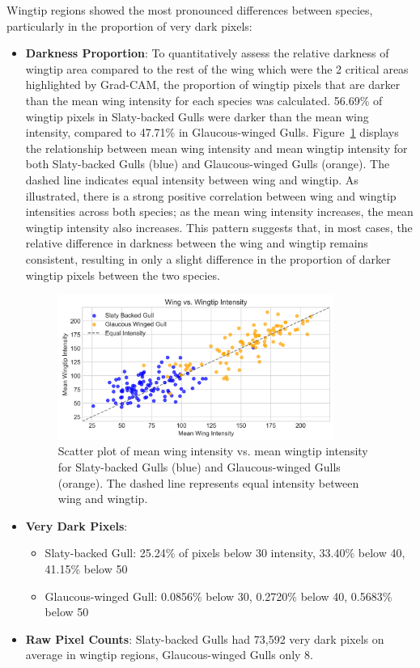 \documentclass[a4paper,12pt]{report}
\begin{document}
Wingtip regions showed the most pronounced differences between species, particularly in the proportion of very dark pixels:

\begin{itemize}
    \item \textbf{Darkness Proportion}: 
    To quantitatively assess the relative darkness of wingtip area compared to the rest of the wing which were the 2 critical areas highlighted by Grad-CAM, the proportion of wingtip pixels that are darker than the mean wing intensity for each species was calculated.
    56.69\% of wingtip pixels in Slaty-backed Gulls were darker than the mean wing intensity, compared to 47.71\% in Glaucous-winged Gulls.
    Figure~\ref{fig:wing_wingtip_intensity} displays the relationship between mean wing intensity and mean wingtip intensity for both Slaty-backed Gulls (blue) and Glaucous-winged Gulls (orange).
    The dashed line indicates equal intensity between wing and wingtip. As illustrated, there is a strong positive correlation between wing and wingtip intensities across both species; as the mean wing intensity increases, the mean wingtip intensity also increases. This pattern suggests that, in most cases, the relative difference in darkness between the wing and wingtip remains consistent, resulting in only a slight difference in the proportion of darker wingtip pixels between the two species.

    \begin{figure}[h]
        \centering
        \includegraphics[width=0.85\textwidth]{images/REPORT_IMAGES_INTENSITY/I2/clusterwingwingtip.png}
        \caption{Scatter plot of mean wing intensity vs. mean wingtip intensity for Slaty-backed Gulls (blue) and Glaucous-winged Gulls (orange). The dashed line represents equal intensity between wing and wingtip.}
        \label{fig:wing_wingtip_intensity}
    \end{figure}

    \item \textbf{Very Dark Pixels}:
    \begin{itemize}
        \item Slaty-backed Gull: 25.24\% of pixels below 30 intensity, 33.40\% below 40, 41.15\% below 50
        \item Glaucous-winged Gull: 0.0856\% below 30, 0.2720\% below 40, 0.5683\% below 50
    \end{itemize}
    \item \textbf{Raw Pixel Counts}: Slaty-backed Gulls had 73,592 very dark pixels on average in wingtip regions, Glaucous-winged Gulls only 8.
\end{itemize}
\end{document}
